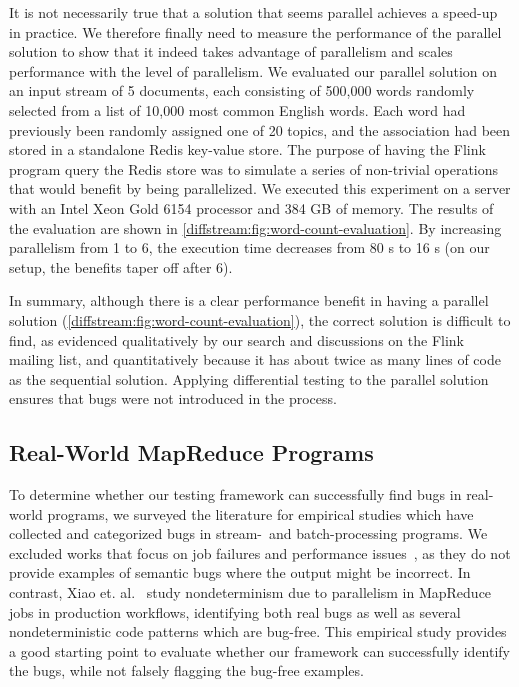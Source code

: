 It is not necessarily true that a solution that seems parallel achieves a speed-up in practice.
We therefore finally need to measure the performance of the parallel solution to show that it indeed takes advantage of parallelism and scales performance with the level of parallelism.
We evaluated our parallel solution on an input stream of 5 documents, each consisting of
500,000 words randomly selected from a list of 10,000 most common English words.
Each word had previously been randomly assigned one of 20 topics, and the
association had been stored in a standalone Redis key-value store. The purpose
of having the Flink program query the Redis store was to simulate a series of
non-trivial operations that would benefit by being parallelized.
We executed this experiment on a server with an Intel Xeon Gold 6154 processor and 384 GB of memory.
The results
of the evaluation are shown in \cref{diffstream:fig:word-count-evaluation}. By increasing
parallelism from 1 to 6, the execution time decreases from 80 s to
16 s (on our setup, the benefits taper off after 6).

In summary, although there is a clear performance benefit in having a parallel solution (\cref{diffstream:fig:word-count-evaluation}), the correct solution is difficult to find, as evidenced qualitatively by our search and discussions on the Flink mailing list, and quantitatively because it has about twice as many lines of code as the sequential solution.
Applying differential testing to the parallel solution ensures that bugs were not introduced in the process.

\subsection{Real-World MapReduce Programs}
\label{diffstream:ssec:evaluation-mapreduce}

To determine whether our testing framework can successfully find bugs in real-world programs, we surveyed the literature for empirical studies which have collected and categorized bugs in stream-~and batch-processing programs. We excluded works that focus on job failures and performance issues~\cite{schroeder2009large,kavulya2010analysis,li2013characteristic,zhou2015empirical}, as they do not provide examples of semantic bugs where the output might be incorrect.
In contrast, Xiao et. al.~\cite{xiao2014nondeterminism} study
nondeterminism due to parallelism
in MapReduce jobs in production workflows,
identifying both real bugs as well as several nondeterministic code patterns which are bug-free.
This empirical study provides a good starting point to evaluate whether our framework can successfully identify the bugs, while not falsely flagging the bug-free examples.

